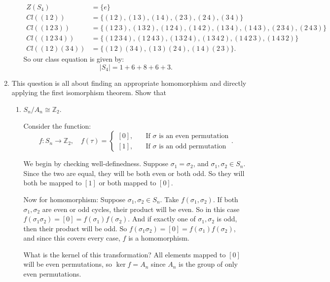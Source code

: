 \documentclass{article}
\begin{document}
\begin{enumerate}
\begin{enumerate}[label= (\alph*)]
            \begin{align*}
                Z(S_4)&= \{e\}  \\
                Cl((1\,2))&=\{(1\,2),(1\,3),(1\,4),(2\,3),(2\,4),(3\,4)\} \\
                Cl((1\,2\,3))&=\{(1\,2\,3),(1\,3\,2),(1\,2\,4),(1\,4\,2)
                            ,(1\,3\,4),(1\,4\,3),(2\,3\,4),(2\,4\,3)\} \\
                Cl((1\,2\,3\,4))&=\{(1\,2\,3\,4),(1\,2\,4\,3),(1\,3\,2\,4),
                            (1\,3\,4\,2),(1\,4\,2\,3),(1\,4\,3\,2)\} \\
                Cl((1\,2)(3\,4))&=\{(1\,2)(3\,4),(1\,3)(2\,4),(1\,4)(2\,3)\} 
            .\end{align*}
            So our class equation is given by:
            \[
            |S_4|=1+6+8+6+3
            .\] 

    \end{enumerate}
\item This question is all about finding an appropriate homomorphism and directly applying the
first isomorphism theorem. Show that
\begin{enumerate}[label= (\alph*)] 
\item $S_n/A_n \cong \mathbb{Z}_2$.

    Consider the function:
    \[
    f:S_n\to\mathbb{Z}_2,\quad f(\tau)=\begin{cases}
        [0],\quad &\text{If $\sigma$ is an even permutation}\\
        [1],\quad &\text{If $\sigma$ is an odd permutation}
    \end{cases}
    .\] 

    We begin by checking well-definedness. Suppose $\sigma_1=\sigma_2$, and $\sigma_1,\sigma_2\in S_n$.
    Since the two are equal, they will be both even or both odd. So they will both be mapped to 
    $[1]$ or both mapped to $[0]$.

    Now for homomorphism: Suppose $\sigma_1,\sigma_2\in S_n$. Take $f(\sigma_1,\sigma_2)$.
    If both $\sigma_1, \sigma_2$ are even or odd cycles, their product will be even. So in this case
    $f(\sigma_1\sigma_2)=[0]=f(\sigma_1)f(\sigma_2)$. And if exactly one of $\sigma_1,\sigma_2$ is
    odd, then their product will be odd. So $f(\sigma_1\sigma_2)=[0]=f(\sigma_1)f(\sigma_2)$, and since
    this covers every case, $f$ is a homomorphism.

    What is the kernel of this transformation? All elements mapped to $[0]$ will be even permutations, 
    so $\ker f=A_n$ since $A_n$ is the group of only even permutations.


\end{enumerate}
\end{enumerate}
\end{document}
